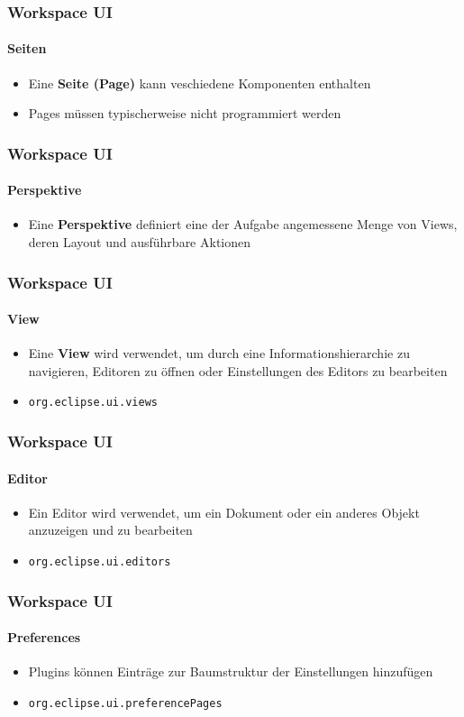 {\begin{frame}
  \frametitle{Workspace UI}
  \framesubtitle{Seiten}
  \begin{itemize}
    \item Eine \textbf{Seite (Page)} kann veschiedene Komponenten enthalten
    \item Pages müssen typischerweise nicht programmiert werden
  \end{itemize}
\end{frame}

\begin{frame}
  \frametitle{Workspace UI}
  \framesubtitle{Perspektive}
  \begin{itemize}
    \item Eine \textbf{Perspektive} definiert eine der Aufgabe angemessene Menge von Views, deren Layout und ausführbare Aktionen
  \end{itemize}
\end{frame}

\begin{frame}
  \frametitle{Workspace UI}
  \framesubtitle{View}
  \begin{itemize}
    \item Eine \textbf{View} wird verwendet, um durch eine Informationshierarchie zu navigieren, Editoren zu öffnen oder Einstellungen des Editors zu bearbeiten
    \item \texttt{org.eclipse.ui.views}
  \end{itemize}
\end{frame}

\begin{frame}
  \frametitle{Workspace UI}
  \framesubtitle{Editor}
  \begin{itemize}
    \item Ein Editor wird verwendet, um ein Dokument oder ein anderes Objekt anzuzeigen und zu bearbeiten
    \item \texttt{org.eclipse.ui.editors}
  \end{itemize}
\end{frame}

\begin{frame}
  \frametitle{Workspace UI}
  \framesubtitle{Preferences}
  \begin{itemize}
    \item Plugins können Einträge zur Baumstruktur der Einstellungen hinzufügen
    \item \texttt{org.eclipse.ui.preferencePages}
  \end{itemize}
\end{frame}

}
